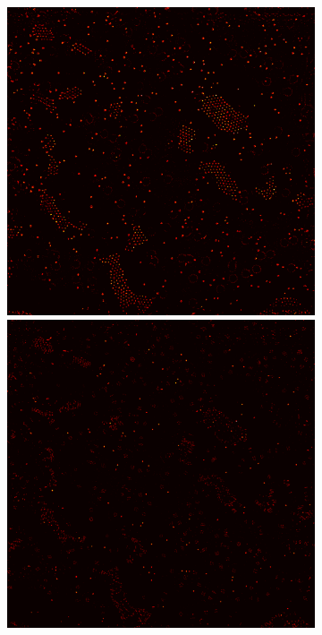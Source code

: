 \documentclass[9pt,twocolumn,twoside]{osajnl}
\begin{document}
\begin{figure}[H]
\begin{subfigure}[b]{0.95\columnwidth}
\begin{minipage}[b]{0.3\columnwidth}
    \end{minipage}
    \begin{minipage}[b]{0.3\columnwidth}
      \includegraphics[width=1\columnwidth]{tikreg_reobj1}
      \includegraphics[width=1\columnwidth]{tikreg_reobj2}

\end{minipage}
\end{subfigure}
\end{figure}
\end{document}
